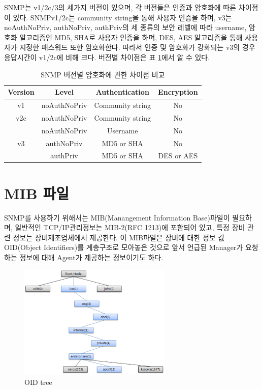 \documentclass[11pt
  , a4paper
  , article
  , oneside
]{memoir}
\begin{document}
\hfil\break
\hfil\break
\hfil\break
\hfil\break

SNMP는 v1/2c/3의 세가지 버전이 있으며, 각 버전들은 인증과 암호화에 따른 차이점이 있다. SNMPv1/2c는 community string을 통해 사용자 인증을 하며, v3는 noAuthNoPriv, authNoPriv, authPriv의 세 종류의 보안 레벨에 따라 username, 암호화 알고리즘인 MD5, SHA로 사용자 인증을 하며, DES, AES 알고리즘을 통해 사용자가 지정한 패스워드 또한 암호화한다. 따라서 인증 및 암호화가 강화되는 v3의 경우 응답시간이 v1/2c에 비해 크다. 버전별 차이점은 표 \ref{table:conparision}\citep{comparison}에서 알 수 있다.

\begin{table}[h!]
\begin{center}
\begin{tabular}{c|c|c|c}\hline
Version & Level & Authentication & Encryption \\ \hline
v1 & noAuthNoPriv & Community string & No \\ \hline
v2c & noAuthNoPriv & Community string & No \\ \hline
 & noAuthNoPriv & Username & No \\ \cline{2-4}
v3 & authNoPriv & MD5 or SHA & No \\ \cline{2-4}
 & authPriv & MD5 or SHA & DES or AES \\ \hline
\end{tabular}
\caption{SNMP 버전별 암호화에 관한 차이점 비교}
  \label{table:conparision}  
\end{center}
\end{table} 

\section{MIB 파일}
SNMP를 사용하기 위해서는 MIB(Manangement Information Base)파일이 필요하며, 일반적인 TCP/IP관리정보는 MIB-2(RFC 1213)에 포함되어 있고, 특정 장비 관련 정보는 장비제조업체에서 제공한다. 이 MIB파일은 장비에 대한 정보 값 OID(Object Identifiers)를 계층구조로 모아놓은 것으로 앞서 언급된 Manager가 요청하는 정보에 대해 Agent가 제공하는 정보이기도 하다. 

\begin{figure}[h!]
  \centering
  \includegraphics[width=0.65\textwidth]{./images/oid_tree.eps}
  \caption{OID tree}
  \label{fig:oid_tree} 
\end{figure}
\end{document}
